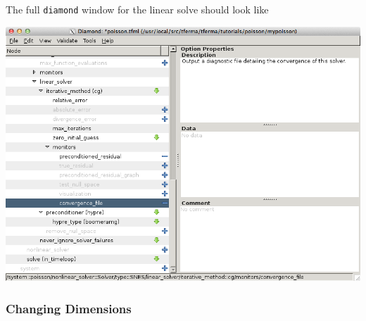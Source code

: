 The full \texttt{diamond} window for the linear solve should look like
\begin{center}
  \includegraphics[width=\diamondwidth]{figures/screendumps/diamond_poisson_cg-hypre.png}
\end{center}


\subsubsection{Changing Dimensions}
\label{sec:changing-dimensions}

